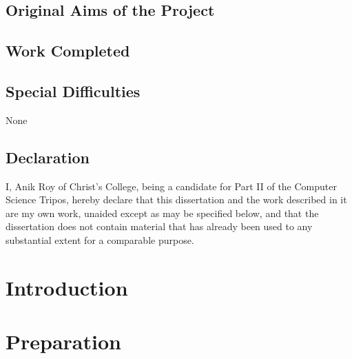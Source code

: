 \documentclass[12pt,twoside,notitlepage,a4paper]{report}
\begin{document}

\section*{Original Aims of the Project}


\section*{Work Completed}


\section*{Special Difficulties}
None

\newpage

\section*{Declaration}

I, Anik Roy of Christ's College, being a candidate for Part II of the Computer
Science Tripos, hereby declare
that this dissertation and the work described in it are my own work,
unaided except as may be specified below, and that the dissertation
does not contain material that has already been used to any substantial
extent for a comparable purpose.

\bigskip
{}

\medskip
{}

\cleardoublepage

\tableofcontents
\listoffigures
\lstlistoflistings


\cleardoublepage        %

\setcounter{page}{1}
\pagestyle{headings}



\chapter{Introduction}

\cleardoublepage

\chapter{Preparation}

\cleardoublepage
\end{document}
